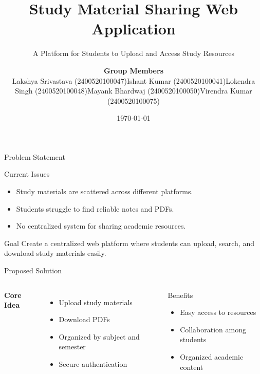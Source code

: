 \documentclass{beamer}
\title[Study Material Sharing App]{Study Material Sharing Web Application}
\subtitle{A Platform for Students to Upload and Access Study Resources}
\author{
\textbf{Group Members}
\begin{itemize}
\item Lakshya Srivastava (2400520100047)
\item Ishant Kumar (2400520100041)
\item Lokendra Singh (2400520100048)
\item Mayank Bhardwaj (2400520100050)
\item Virendra Kumar (2400520100075)
\end{itemize}
}
\date{\today}
\begin{document}
\begin{frame}
\titlepage
\end{frame}

\begin{frame}{Problem Statement}
\begin{block}{Current Issues}
\begin{itemize}
\item Study materials are scattered across different platforms.
\item Students struggle to find reliable notes and PDFs.
\item No centralized system for sharing academic resources.
\end{itemize}
\end{block}

\begin{alertblock}{Goal}
Create a centralized web platform where students can upload, search, and download study materials easily.
\end{alertblock}

\end{frame}


\begin{frame}{Proposed Solution}

\begin{columns}


\textbf{Core Idea}

\begin{itemize}
\item Upload study materials
\item Download PDFs
\item Organized by subject and semester
\item Secure authentication
\end{itemize}


\begin{block}{Benefits}
\begin{itemize}
\item Easy access to resources
\item Collaboration among students
\item Organized academic content
\end{itemize}
\end{block}

\end{columns}

\end{frame}
\end{document}
